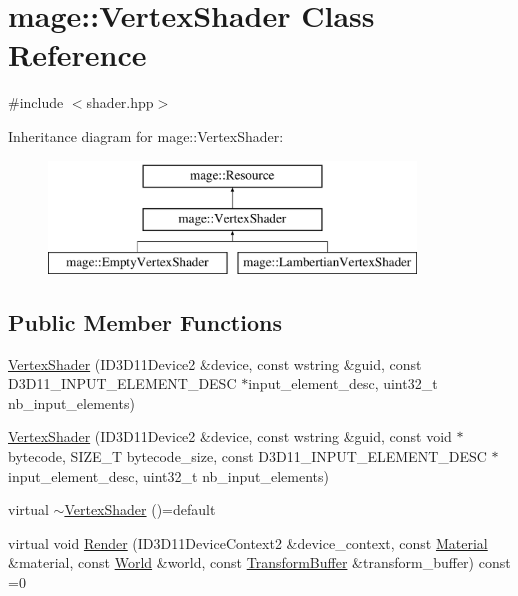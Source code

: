 \hypertarget{classmage_1_1_vertex_shader}{}\section{mage\+:\+:Vertex\+Shader Class Reference}
\label{classmage_1_1_vertex_shader}


{\ttfamily \#include $<$shader.\+hpp$>$}

Inheritance diagram for mage\+:\+:Vertex\+Shader\+:\begin{figure}[H]
\begin{center}
\leavevmode
\includegraphics[height=3.000000cm]{classmage_1_1_vertex_shader}
\end{center}
\end{figure}
\subsection*{Public Member Functions}
\begin{DoxyCompactItemize}
\item 
\hyperlink{classmage_1_1_vertex_shader_ad3ca2671c8690a886f99a99235deda8b}{Vertex\+Shader} (I\+D3\+D11\+Device2 \&device, const wstring \&guid, const D3\+D11\+\_\+\+I\+N\+P\+U\+T\+\_\+\+E\+L\+E\+M\+E\+N\+T\+\_\+\+D\+E\+SC $\ast$input\+\_\+element\+\_\+desc, uint32\+\_\+t nb\+\_\+input\+\_\+elements)
\item 
\hyperlink{classmage_1_1_vertex_shader_a29eea284f609c5bbefa9f67238bc6c5a}{Vertex\+Shader} (I\+D3\+D11\+Device2 \&device, const wstring \&guid, const void $\ast$bytecode, S\+I\+Z\+E\+\_\+T bytecode\+\_\+size, const D3\+D11\+\_\+\+I\+N\+P\+U\+T\+\_\+\+E\+L\+E\+M\+E\+N\+T\+\_\+\+D\+E\+SC $\ast$input\+\_\+element\+\_\+desc, uint32\+\_\+t nb\+\_\+input\+\_\+elements)
\item 
virtual \hyperlink{classmage_1_1_vertex_shader_a83e5bd464361b7f94f969475f1eeaf2a}{$\sim$\+Vertex\+Shader} ()=default
\item 
virtual void \hyperlink{classmage_1_1_vertex_shader_a095834b90967611e69205e9e82f4a536}{Render} (I\+D3\+D11\+Device\+Context2 \&device\+\_\+context, const \hyperlink{structmage_1_1_material}{Material} \&material, const \hyperlink{classmage_1_1_world}{World} \&world, const \hyperlink{structmage_1_1_transform_buffer}{Transform\+Buffer} \&transform\+\_\+buffer) const =0
\end{DoxyCompactItemize}
